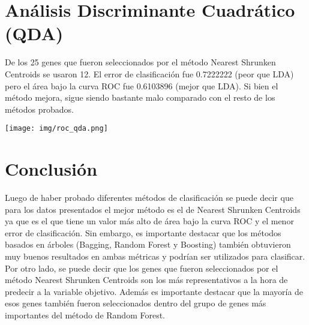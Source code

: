 \documentclass{article}
\begin{document}
\section{Análisis Discriminante Cuadrático (QDA)}
De los 25 genes que fueron seleccionados por el método Nearest Shrunken Centroids se usaron 12. El error de clasificación fue 0.7222222 (peor que LDA) pero el área bajo la curva ROC fue 0.6103896 (mejor que LDA). Si bien el método mejora, sigue siendo bastante malo comparado con el resto de los métodos probados.

\begin{center}
    \texttt{[image: img/roc\_qda.png]}
\end{center}


\section{Conclusión}
Luego de haber probado diferentes métodos de clasificación se puede decir que para los datos presentados el mejor método es el de Nearest Shrunken Centroids ya que es el que tiene un valor más alto de área bajo la curva ROC y el menor error de clasificación. Sin embargo, es importante destacar que los métodos basados en árboles (Bagging, Random Forest y Boosting) también obtuvieron muy buenos resultados en ambas métricas y podrían ser utilizados para clasificar.\\

\noindent
Por otro lado, se puede decir que los genes que fueron seleccionados por el método Nearest Shrunken Centroids son los más representativos a la hora de predecir a la variable objetivo. Además es importante destacar que la mayoría de esos genes también fueron seleccionados dentro del grupo de genes más importantes del método de Random Forest.
\end{document}
